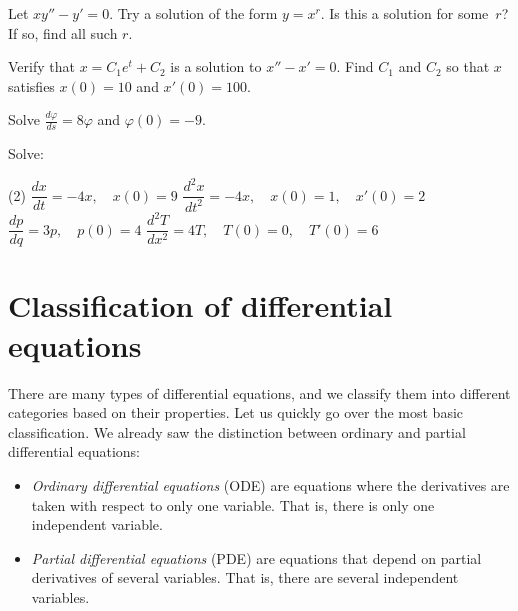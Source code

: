 \begin{exercise}
Let $xy'' - y' = 0$.  Try a solution of the form $y = x^r$.  Is this a
solution for some~$r$?  If so, find all such $r$.
\end{exercise}


\begin{exercise}
Verify that $x=C_1e^t+C_2$ is a solution to $x''-x' = 0$.  Find $C_1$ and
$C_2$ so that $x$ satisfies $x(0) = 10$ and $x'(0) = 100$.
\end{exercise}

\begin{exercise}
Solve $\frac{d\varphi}{ds} = 8 \varphi$ and $\varphi(0) = -9$.
\end{exercise}

\begin{exercise}
Solve:
\begin{tasks}(2)
\task $\dfrac{dx}{dt} = -4x, \quad x(0)=9$
\task $\dfrac{d^2x}{dt^2} = -4x, \quad x(0)=1, \quad x'(0)=2$
\task $\dfrac{dp}{dq} = 3 p, \quad p(0)=4$
\task $\dfrac{d^2T}{dx^2} = 4 T, \quad T(0)=0, \quad T'(0)=6$
\end{tasks}
\end{exercise}


\sectionnewpage
\section{Classification of differential equations}
\label{classification:section}


There are many types of differential equations, and we classify them into
different categories based on their properties.  Let us quickly go over
the most basic classification.  We already saw the distinction
between ordinary and partial differential equations:
\begin{itemize}
\item
\emph{Ordinary differential equations}
 (ODE) are
equations where the derivatives are taken with respect to only one variable.
That is, there is only one independent variable.
\item
\emph{Partial differential equations}
 (PDE) are
equations that depend on partial derivatives of several variables.
That is, there are several independent variables.
\end{itemize}

